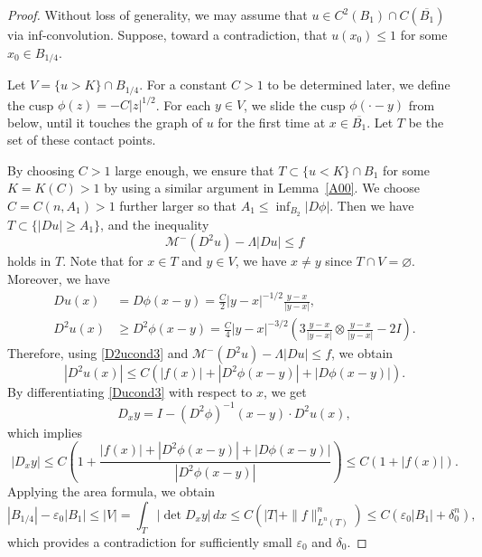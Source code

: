 \documentclass[11pt]{amsart}
\theoremstyle{plain}
\theoremstyle{definition}
\numberwithin{equation}{section}
\begin{document}
\begin{proof}
Without loss of generality, we may assume that $u \in C^2(B_1) \cap C(\overline{B_1})$ via inf-convolution. Suppose, toward a contradiction, that $u(x_0) \leq 1$ for some $x_0 \in B_{1/4}$. 

Let $V = \{u>K\} \cap B_{1/4}$. 
For a constant $C>1$ to be determined later, we define the cusp $\phi(z) = -C|z|^{1/2}$.
For each $y \in V$, we slide the cusp $\phi(\cdot-y)$ from below, until it touches the graph of $u$ for the first time at $x \in \overline{B_1}$.
Let $T$ be the set of these contact points.

By choosing $C>1$ large enough, we ensure that $T \subset \{u <K\} \cap  B_1$ for some $K=K(C)>1$ by using a similar argument in Lemma~\ref{A00}. 
We choose $C=C(n,A_1)>1$ further larger so that $A_1 \leq \inf_{B_2} |D\phi|$.
Then we have $ T \subset \{|Du| \geq A_1\}$, and the inequality 
\begin{equation*}
    \mathcal{M}^-(D^2u)-\Lambda|Du| \leq f
\end{equation*}
holds in $T$. Note that for $x \in T$ and $y \in V$, we have $x\neq y$ since $T\cap V =\varnothing$.
Moreover, we have
\begin{align} \label{Ducond3}
    Du(x) &= D\phi(x-y) =\frac{C}{2}|y-x|^{-1/2}\frac{y-x}{|y-x|},\\ \label{D2ucond3}
    D^2u(x) &\geq D^2\phi(x-y)=\frac{C}{4}|y-x|^{-3/2}\left(3\frac{y-x}{|y-x|} \otimes \frac{y-x}{|y-x|}-2I\right).
\end{align}
Therefore, using \eqref{D2ucond3} and $\mathcal{M}^-(D^2u)-\Lambda|Du| \leq f$, we obtain
\begin{equation*}
    |D^2u(x)| \leq C(|f(x)|+|D^2\phi(x-y)| + |D\phi(x-y)|).
\end{equation*}
By differentiating \eqref{Ducond3} with respect to $x$, we get
\begin{equation*}
    D_xy = I -(D^2\phi)^{-1}(x-y) \cdot D^2u(x),
\end{equation*}
which implies
\begin{equation*}
    |D_xy| \leq C\left(1+\frac{|f(x)|+|D^2\phi(x-y)| + |D\phi(x-y)|}{|D^2\phi(x-y)|}\right) \leq C(1+|f(x)|).
\end{equation*}
Applying the area formula, we obtain
\begin{equation*}
    |B_{1/4}|-\varepsilon_0|B_1| \leq  |V| =\int_{T}|\det D_xy| \, dx \leq C(|T|+\|f\|_{L^n(T)}^n) \leq C(\varepsilon_0|B_1| +\delta_0^n),
\end{equation*}
which provides a contradiction for sufficiently small $\varepsilon_0$ and $\delta_0$.
\end{proof}
\end{document}
